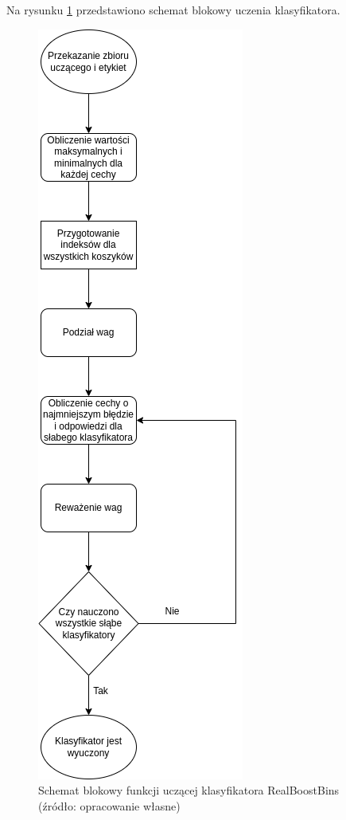 Na rysunku \ref{fig:fit_realboostbins} przedstawiono schemat blokowy uczenia klasyfikatora.
\begin{figure}[!ht]
    \centering
    \includegraphics[scale=0.4]{Pictures/fit_realboostbins}
    \caption{Schemat blokowy funkcji uczącej klasyfikatora RealBoostBins (źródło: opracowanie własne)}
    \label{fig:fit_realboostbins}
\end{figure}
\FloatBarrier


